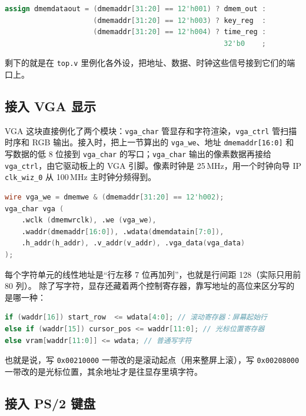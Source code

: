 \documentclass[12pt, a4paper]{ctexart}
\begin{document}
\begin{lstlisting}[language=Verilog]
assign dmemdataout = (dmemaddr[31:20] == 12'h001) ? dmem_out :
                     (dmemaddr[31:20] == 12'h003) ? key_reg  :
                     (dmemaddr[31:20] == 12'h004) ? time_reg :
                                                    32'b0    ;
\end{lstlisting}

剩下的就是在 \lstinline|top.v| 里例化各外设，把地址、数据、时钟这些信号接到它们的端口上。

\subsection{接入 VGA 显示}

VGA 这块直接例化了两个模块：\lstinline|vga_char| 管显存和字符渲染，\lstinline|vga_ctrl|
管扫描时序和 RGB 输出。接入时，把上一节算出的 \lstinline|vga_we|、地址 \lstinline|dmemaddr[16:0]|
和写数据的低 8 位接到 \lstinline|vga_char| 的写口；\lstinline|vga_char| 输出的像素数据再接给
\lstinline|vga_ctrl|，由它驱动板上的 VGA 引脚。像素时钟是 25\,MHz，用一个时钟向导 IP
\lstinline|clk_wiz_0| 从 100\,MHz 主时钟分频得到。

\begin{lstlisting}[language=Verilog]
wire vga_we = dmemwe & (dmemaddr[31:20] == 12'h002);
vga_char vga (
    .wclk (dmemwrclk), .we (vga_we),
    .waddr(dmemaddr[16:0]), .wdata(dmemdatain[7:0]),
    .h_addr(h_addr), .v_addr(v_addr), .vga_data(vga_data)
);
\end{lstlisting}

每个字符单元的线性地址是“行左移 7 位再加列”，也就是行间距 128（实际只用前 80 列）。
除了写字符，显存还藏着两个控制寄存器，靠写地址的高位来区分写的是哪一种：

\begin{lstlisting}[language=Verilog]
if (waddr[16]) start_row  <= wdata[4:0]; // 滚动寄存器：屏幕起始行
else if (waddr[15]) cursor_pos <= waddr[11:0]; // 光标位置寄存器
else vram[waddr[11:0]] <= wdata; // 普通写字符
\end{lstlisting}

也就是说，写 \lstinline|0x00210000| 一带改的是滚动起点（用来整屏上滚），写
\lstinline|0x00208000| 一带改的是光标位置，其余地址才是往显存里填字符。

\subsection{接入 PS/2 键盘}
\end{document}

